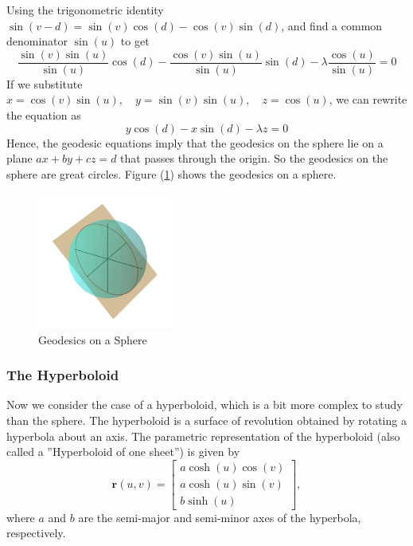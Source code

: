 \documentclass[12pt]{article}
\begin{document}
Using the trigonometric identity \(\sin(v - d) = \sin(v)\cos(d) - \cos(v)\sin(d)\),  and find a common denominator $\sin(u)$ to get
\[
    \frac{\sin(v)\sin(u)}{\sin(u)}\cos(d) - \frac{\cos(v)\sin(u)}{\sin(u)}\sin(d) - \lambda \frac{\cos(u)}{\sin(u)} = 0
\]
If we substitute \(x = \cos(v)\sin(u), \quad y = \sin(v)\sin(u), \quad z = \cos(u)\), we can rewrite the equation as
\[
    y\cos(d) - x\sin(d) - \lambda z = 0
\]
Hence, the geodesic equations imply that the geodesics on the sphere lie on a plane \( ax + by + cz = d \) that passes through the origin.
So the geodesics on the sphere are great circles. Figure (\ref{fig:geodesics-on-sphere}) shows the geodesics on a sphere.

\begin{figure}[ht]
	\centering
	\includegraphics[width=0.4\textwidth]{images/sphere_circle_plane.png}
	\caption{Geodesics on a Sphere}
	\label{fig:geodesics-on-sphere}
\end{figure}

\subsubsection{The Hyperboloid}

Now we consider the case of a hyperboloid, which is a bit more complex to study than the sphere.
The hyperboloid is a surface of revolution obtained by rotating a hyperbola about an axis.
The parametric representation of the hyperboloid (also called a ”Hyperboloid of one sheet”) is given by
\[
    \mathbf{r}(u, v) = \begin{bmatrix} a \cosh (u) \cos (v) \\ a \cosh (u) \sin (v) \\ b \sinh (u) \end{bmatrix},
\]
where \(a\) and \(b\) are the semi-major and semi-minor axes of the hyperbola, respectively.
\end{document}

